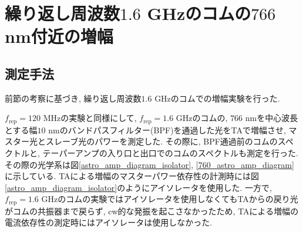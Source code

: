 \documentclass[uplatex, dvipdfmx, a4paper, report, papersize, 11pt]{jsbook}
\begin{document}
\section{繰り返し周波数$1.6$ GHzのコムの$766$ nm付近の増幅}
\subsection{測定手法}
 前節の考察に基づき, 繰り返し周波数$1.6$ GHzのコムでの増幅実験を行った. \par
$f_{\mathrm{rep}} = 120$ MHzの実験と同様にして, $f_{\mathrm{rep}} = 1.6$ GHzのコムの, $766$ nmを中心波長とする幅$10$ nmのバンドパスフィルター(BPF)を通過した光をTAで増幅させ, マスター光とスレーブ光のパワーを測定した. その際に, BPF通過前のコムのスペクトルと, テーパーアンプの入り口と出口でのコムのスペクトルも測定を行った. その際の光学系は図\ref{astro_amp_diagram_isolator}, \ref{760_astro_amp_diagram}に示している. TAによる増幅のマスターパワー依存性の計測時には図\ref{astro_amp_diagram_isolator}のようにアイソレータを使用した. 一方で, $f_{\mathrm{rep}} = 1.6$
 GHzのコムの実験ではアイソレータを使用しなくてもTAからの戻り光がコムの共振器まで戻らず, cw的な発振を起こさなかったため, TAによる増幅の電流依存性の測定時にはアイソレータは使用しなかった. \\
\end{document}
